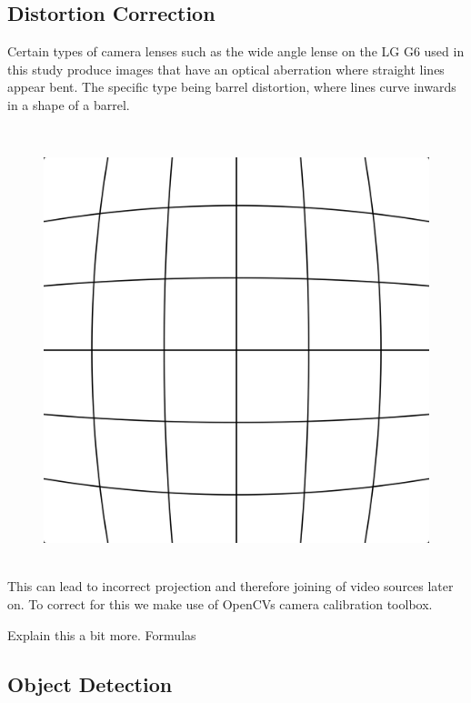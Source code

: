\documentclass[
10pt, %
a4paper, %
oneside, %
headinclude,footinclude, %
] {book}%
\begin{document}
\subsection{Distortion Correction}

Certain types of camera lenses such as the wide angle lense on the LG G6 used in this study produce images that have an optical aberration where straight lines appear bent. 
The specific type being barrel distortion, where lines curve inwards in a shape of a barrel.

\ \\ 
\begin{figure}[h]
  \includegraphics[scale=0.10]{Barrel_distortion.svg.png}
  \centering 
  \end{figure}
  \label{distortion}

\ \\
This can lead to incorrect projection and therefore joining of video sources later on.
To correct for this we make use of OpenCVs camera calibration toolbox.

Explain this a bit more. Formulas
\ \\
\subsection{Object Detection}
\end{document}
